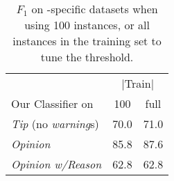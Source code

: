 \begin{table}[t]
    \centering
    \begin{tabular}{lcc}
        \toprule
         & \multicolumn{2}{c}{$|$Train$|$} \\
        Our Classifier on \taxtype{} & 100 & full \\
        \midrule
        \textit{Tip} (no \textit{warning}s) & 70.0 & 71.0 \\
        \textit{Opinion}                    & 85.8 & 87.6 \\
        \textit{Opinion w/Reason}           & 62.8 & 62.8 \\
        \bottomrule
    \end{tabular}%
    \caption{$F_1$ on \taxtype{}-specific datasets when using 100 instances, or all instances in the training set to tune the \taxtype{} threshold.}
    \label{tab_predictor_eval}
\end{table}